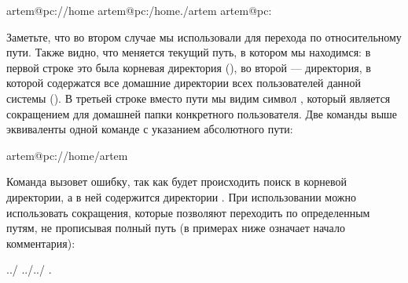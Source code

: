 \documentclass[letterpaper,10pt,russian]{sphinxmanual}
\begin{document}
\begin{sphinxVerbatim}[commandchars=\\\{\}]
artem@pc:/\PYGZdl{}/home
artem@pc:/home\PYGZdl{}./artem
artem@pc:\PYGZti{}\PYGZdl{}
\end{sphinxVerbatim}

\sphinxAtStartPar
Заметьте, что во втором случае мы использовали  для перехода по относительному пути. Также видно, что меняется текущий путь, в котором мы находимся: в первой строке это была корневая директория (\sphinxcode{\sphinxupquote{/}}), во второй — директория, в которой содержатся все домашние директории всех пользователей данной системы (). В третьей строке вместо пути мы видим символ \sphinxcode{\sphinxupquote{\textasciitilde{}}}, который является сокращением для домашней папки конкретного пользователя. Две команды выше эквиваленты одной команде с указанием абсолютного пути:

\begin{sphinxVerbatim}[commandchars=\\\{\}]
artem@pc:/\PYGZdl{}/home/artem
\end{sphinxVerbatim}

\sphinxAtStartPar
Команда  вызовет ошибку, так как будет происходить поиск в корневой директории, а в ней  содержится директории .
При использовании  можно использовать сокращения, которые позволяют переходить по определенным путям, не прописывая полный путь (в примерах ниже \sphinxcode{\sphinxupquote{\#}} означает начало комментария):

\begin{sphinxVerbatim}[commandchars=\\\{\}]
\PYGZti{}
../
../../
\PYGZhy{}
.
\end{sphinxVerbatim}
\end{document}
